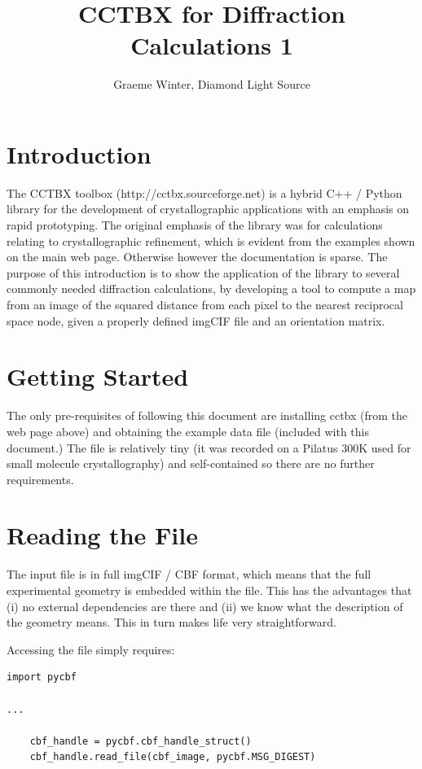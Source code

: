 \documentclass[a4paper, 11pt]{article}
\title{CCTBX for Diffraction Calculations 1}
\author{Graeme Winter, Diamond Light Source}
\begin{document}
\maketitle

\section{Introduction}

The CCTBX toolbox (http://cctbx.sourceforge.net) is a hybrid C++ / Python library for the development of crystallographic applications with an emphasis on rapid prototyping. The original emphasis of the library was for calculations relating to crystallographic refinement, which is evident from the examples shown on the main web page. Otherwise however the documentation is sparse. The purpose of this introduction is to show the application of the library to several commonly needed diffraction calculations, by developing a tool to compute a map from an image of the squared distance from each pixel to the nearest reciprocal space node, given a properly defined imgCIF file and an orientation matrix.

\section{Getting Started}

The only pre-requisites of following this document are installing cctbx (from the web page above) and obtaining the example data file (included with this document.) The file is relatively tiny (it was recorded on a Pilatus 300K used for small molecule crystallography) and self-contained so there are no further requirements. 

\section{Reading the File}

The input file is in full imgCIF / CBF format, which means that the full experimental geometry is embedded within the file. This has the advantages that (i) no external dependencies are there and (ii) we know what the description of the geometry means. This in turn makes life very straightforward. 

Accessing the file simply requires:

{\small
\begin{verbatim}
import pycbf

...

    cbf_handle = pycbf.cbf_handle_struct()
    cbf_handle.read_file(cbf_image, pycbf.MSG_DIGEST)
\end{verbatim}
}
\end{document}
